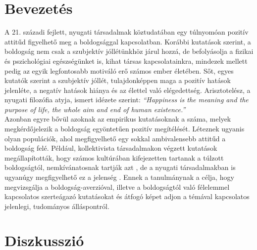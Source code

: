 \section{Bevezetés}
A 21. századi fejlett, nyugati társadalmak köztudatában egy túlnyomóan pozitív attitűd figyelhető meg a boldogsággal kapcsolatban. Korábbi kutatások szerint, a boldogság nem csak a szubjektív jóllétünkhöz járul hozzá, de befolyásolja a fizikai és pszichológiai egészségünket is, kihat társas kapcsolatainkra, mindezek mellett pedig az egyik legfontosabb motiváló erő számos ember életében. Sőt, egyes kutatók szerint a szubjektív jóllét, tulajdonképpen maga a pozitív hatások jelenléte, a negatív hatások hiánya és az élettel való elégedettség.\cite{diener_suh_lucas_smith_1999} Arisztotelész, a nyugati filozófia atyja, ismert idézete szerint: \textit{“Happiness is the meaning and the purpose of life, the whole aim and end of human existence.”} \medskip 
\\ Azonban egyre bővül azoknak az empirikus kutatásoknak a száma, melyek megkérdő\-jelezik  a boldogság egyöntetűen pozitív megítélését. Léteznek ugyanis olyan populációk, ahol megfigyelhető egy sokkal ambivalensebb attitűd a boldogság felé. Például, kollektivista társadalmakon végzett kutatások megállapították, hogy számos kultúrá\-ban kifejezetten tartanak a túlzott boldogságtól, nemkívánatosnak tartják azt \cite{joshanloo_weijers_2013} \cite{joshanloo_lepshokova_panyusheva_natalia_poon_yeung_sundaram_achoui_asano_igarashi}, de a nyugati társadalmakban is ugyanúgy megfigyelhető ez a jelenség \cite{gilbert_mcewan_catarino_baiao_palmeira_2013}.  Ennek a tanulmánynak a célja, hogy megvizsgálja a boldogság-averzióval, illetve a boldogságtól való félelemmel kapcsolatos szerteágazó kutatásokat és átfogó képet adjon a témával kapcsolatos jelenlegi, tudományos álláspontról. \medskip 

\pagebreak
\section {Diszkusszió}
